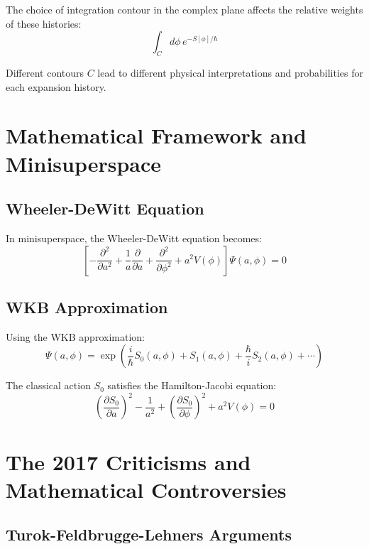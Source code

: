 \documentclass[12pt,a4paper]{article}
\begin{document}
The choice of integration contour in the complex plane affects the relative weights of these histories:
\begin{equation}
\int_C d\phi \, e^{-S[\phi]/\hbar}
\end{equation}

Different contours $C$ lead to different physical interpretations and probabilities for each expansion history.

\section{Mathematical Framework and Minisuperspace}

\subsection{Wheeler-DeWitt Equation}

In minisuperspace, the Wheeler-DeWitt equation becomes:
\begin{equation}
\left[-\frac{\partial^2}{\partial a^2} + \frac{1}{a}\frac{\partial}{\partial a} + \frac{\partial^2}{\partial\phi^2} + a^2 V(\phi)\right]\Psi(a,\phi) = 0
\end{equation}

\subsection{WKB Approximation}

Using the WKB approximation:
\begin{equation}
\Psi(a,\phi) = \exp\left(\frac{i}{\hbar}S_0(a,\phi) + S_1(a,\phi) + \frac{\hbar}{i}S_2(a,\phi) + \cdots\right)
\end{equation}

The classical action $S_0$ satisfies the Hamilton-Jacobi equation:
\begin{equation}
\left(\frac{\partial S_0}{\partial a}\right)^2 - \frac{1}{a^2} + \left(\frac{\partial S_0}{\partial\phi}\right)^2 + a^2 V(\phi) = 0
\end{equation}

\section{The 2017 Criticisms and Mathematical Controversies}

\subsection{Turok-Feldbrugge-Lehners Arguments}
\end{document}
